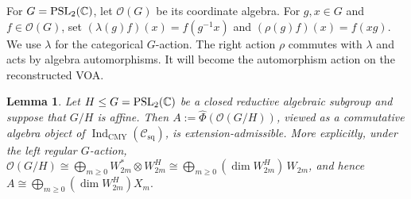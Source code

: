 \documentclass[10pt,a4paper]{amsart}
\numberwithin{equation}{section} \newtheorem{thm}{Theorem}[section] \newtheorem{lem}[thm]{Lemma} \newtheorem{ex}[thm]{Example} \newtheorem{prop}[thm]{Proposition} \newtheorem{cor}[thm]{Corollary} \newtheorem{defi}[thm]{Definition} \newtheorem{rmk}[thm]{Remark} \newtheorem{notation}[thm]{Notation}
\newcommand{\OO}{\mathcal O}
\newcommand{\Csq}{\mathcal C_{\mathrm{sq}}}
\newcommand{\IndCMY}{\operatorname{Ind}_{\mathrm{CMY}}}
\newcommand{\PSLtwo}{\operatorname{PSL}_2(\C)}
\begin{document}
For $G=\PSLtwo$, let $\OO(G)$ be its coordinate algebra. For $g,x\in G$ and $f\in\OO(G)$, set \((\lambda(g)f)(x)=f(g^{-1}x)\) and \((\rho(g)f)(x)=f(xg)\). We use $\lambda$ for the categorical $G$-action. The right action $\rho$ commutes with $\lambda$ and acts by algebra automorphisms. It will become the automorphism action on the reconstructed VOA.

\begin{lem}\label{lem:admissible-homogeneous}
Let $H\le G=\PSLtwo$ be a closed reductive algebraic subgroup and suppose that $G/H$ is affine. Then \(A:=\widehat\Phi(\OO(G/H))\), viewed as a commutative algebra object of \(\IndCMY(\Csq)\), is extension-admissible. More explicitly, under the left regular $G$-action, \(\OO(G/H) \cong \bigoplus_{m\ge0}W_{2m}^*\otimes W_{2m}^H \cong \bigoplus_{m\ge0}(\dim W_{2m}^H)\,W_{2m}\), and hence \(A\cong\bigoplus_{m\ge0}(\dim W_{2m}^H) X_m.\)
\end{lem}
\end{document}
